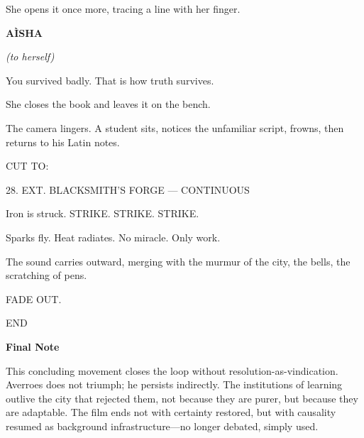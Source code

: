 \documentclass[12pt]{article}
\newlength{\charindent}
\newlength{\dialogueindent}
\newlength{\dialoguewidth}
\newlength{\transitionindent}
\newcommand{\sectionhead}[1]{\vspace{1em}\textbf{#1}\vspace{0.25em}}
\newcommand{\slug}[1]{\vspace{1.25em}\textsc{#1}\vspace{0.5em}}
\newcommand{\action}[1]{#1}
\newcommand{\character}[1]{%
  \par\vspace{0.75em}%
  \hspace*{\charindent}\textbf{#1}%
}
\newcommand{\parenthetical}[1]{%
  \par\nobreak
  \hspace*{\dialogueindent}\textit{(#1)}%
}
\newcommand{\dialogue}[1]{%
  \par\nobreak
  \hspace*{\dialogueindent}%
  \begin{minipage}[t]{\dialoguewidth}
  #1
  \end{minipage}
}
\newcommand{\transition}[1]{%
  \par\vspace{1em}%
  \hspace*{\transitionindent}\textsc{#1}%
}
\begin{document}
\action{She opens it once more, tracing a line with her finger.}

\character{A\`ISHA}
\parenthetical{to herself}
\dialogue{You survived badly. That is how truth survives.}

\action{She closes the book and leaves it on the bench.}

\action{The camera lingers. A student sits, notices the unfamiliar script, frowns, then returns to his Latin notes.}

\transition{CUT TO:}

\slug{28. EXT. BLACKSMITH’S FORGE --- CONTINUOUS}

\action{Iron is struck. STRIKE. STRIKE. STRIKE.}

\action{Sparks fly. Heat radiates. No miracle. Only work.}

\action{The sound carries outward, merging with the murmur of the city, the bells, the scratching of pens.}

\transition{FADE OUT.}

\slug{END}

\sectionhead{Final Note}

This concluding movement closes the loop without resolution-as-vindication. Averroes does not triumph; he persists indirectly. The institutions of learning outlive the city that rejected them, not because they are purer, but because they are adaptable. The film ends not with certainty restored, but with causality resumed as background infrastructure—no longer debated, simply used.
\end{document}
